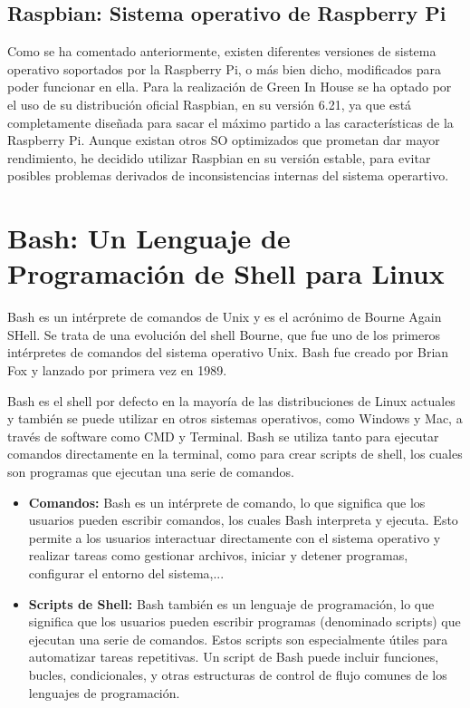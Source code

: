     \subsection{Raspbian: Sistema operativo de Raspberry Pi}
    Como se ha comentado anteriormente, existen diferentes versiones de sistema operativo soportados por la Raspberry Pi, o más bien dicho, modificados para poder funcionar en ella. 
    Para la realización de Green In House se ha optado por el uso de su distribución oficial Raspbian, en su versión 6.21, ya que está completamente diseñada para sacar el máximo partido a las características de la Raspberry Pi. Aunque existan otros SO optimizados que prometan dar mayor rendimiento, he decidido utilizar Raspbian en su versión estable, para evitar posibles problemas derivados de inconsistencias internas del sistema operartivo.

\section{Bash: Un Lenguaje de Programación de Shell para Linux}
Bash \citep{wiki:bash} es un intérprete de comandos de Unix y es el acrónimo de Bourne Again SHell. Se trata de una evolución del shell Bourne, que fue uno de los primeros intérpretes de comandos del sistema operativo Unix. Bash fue creado por Brian Fox y lanzado por primera vez en 1989. 

Bash es el shell por defecto en la mayoría de las distribuciones de Linux actuales y también se puede utilizar en otros sistemas operativos, como Windows y Mac, a través de software como CMD y Terminal. Bash se utiliza tanto para ejecutar comandos directamente en la terminal, como para crear scripts de shell, los cuales son programas que ejecutan una serie de comandos.

\begin{itemize}
    \item \textbf{Comandos:} Bash es un intérprete de comando, lo que significa que los usuarios pueden escribir comandos, los cuales Bash interpreta y ejecuta. Esto permite a los usuarios interactuar directamente con el sistema operativo y realizar tareas como gestionar archivos, iniciar y detener programas, configurar el entorno del sistema,...  
    \item \textbf{Scripts de Shell:} Bash también es un lenguaje de programación, lo que significa que los usuarios pueden escribir programas (denominado scripts) que ejecutan una serie de comandos. Estos scripts son especialmente útiles para automatizar tareas repetitivas. Un script de Bash puede incluir funciones, bucles, condicionales, y otras estructuras de control de flujo comunes de los lenguajes de programación.   
\end{itemize}
